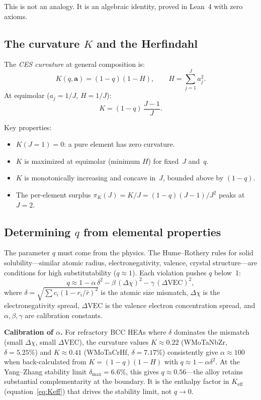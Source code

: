 \documentclass[12pt,letterpaper]{article}
\theoremstyle{definition}
\begin{document}
This is not an analogy.  It is an algebraic identity, proved in Lean~4 with zero axioms.

\subsection{The curvature $K$ and the Herfindahl}

The \emph{CES curvature} at general composition is:
\begin{equation}\label{eq:curvature}
  K(q, \mathbf{a}) = (1 - q)(1 - H), \qquad H = \sum_{j=1}^{J} a_j^2.
\end{equation}
At equimolar ($a_j = 1/J$, $H = 1/J$):
\begin{equation}\label{eq:K_equimolar}
  K = (1-q)\,\frac{J-1}{J}.
\end{equation}

Key properties:
\begin{itemize}
  \item $K(J = 1) = 0$: a pure element has zero curvature.
  \item $K$ is maximized at equimolar (minimum $H$) for fixed~$J$ and~$q$.
  \item $K$ is monotonically increasing and concave in~$J$, bounded above by $(1 - q)$.
  \item The per-element surplus $\pi_K(J) = K/J = (1-q)(J-1)/J^2$ peaks at $J = 2$.
\end{itemize}

\subsection{Determining $q$ from elemental properties}

The parameter $q$ must come from the physics.  The Hume--Rothery rules for solid solubility---similar atomic radius, electronegativity, valence, crystal structure---are conditions for high substitutability ($q \approx 1$).  Each violation pushes $q$ below~1:
\begin{equation}\label{eq:q_estimate}
  q \approx 1 - \alpha\,\delta^2 - \beta\,(\Delta\chi)^2 - \gamma\,(\Delta\mathrm{VEC})^2,
\end{equation}
where $\delta = \sqrt{\sum c_i(1 - r_i/\bar{r})^2}$ is the atomic size mismatch, $\Delta\chi$ is the electronegativity spread, $\Delta\mathrm{VEC}$ is the valence electron concentration spread, and $\alpha, \beta, \gamma$ are calibration constants.

\textbf{Calibration of $\alpha$.}  For refractory BCC HEAs where $\delta$ dominates the mismatch (small $\Delta\chi$, small $\Delta\mathrm{VEC}$), the curvature values $K \approx 0.22$ (WMoTaNbZr, $\delta = 5.25\%$) and $K \approx 0.41$ (WMoTaCrHf, $\delta = 7.17\%$) consistently give $\alpha \approx 100$ when back-calculated from $K = (1-q)(1-H)$ with $q \approx 1 - \alpha\delta^2$.  At the Yang--Zhang stability limit $\delta_{\max} = 6.6\%$, this gives $q \approx 0.56$---the alloy retains substantial complementarity at the boundary.  It is the enthalpy factor in $K_{\mathrm{eff}}$ (equation~\ref{eq:Keff}) that drives the stability limit, not $q \to 0$.
\end{document}
